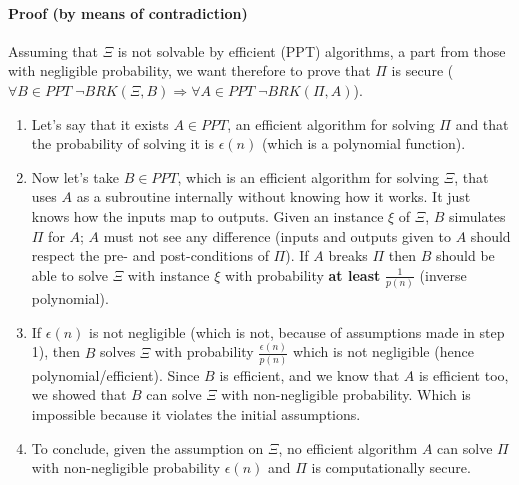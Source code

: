 \documentclass[../main]{subfiles}
\begin{document}
\paragraph{Proof (by means of contradiction)}
Assuming that $\Xi$ is not solvable by efficient (PPT) algorithms, a part from those with negligible probability, we want therefore to prove that $\Pi$ is secure ($\forall{} B \in{} PPT \; \neg BRK(\Xi, B) \Rightarrow{} \forall{} A \in{} PPT \; \neg BRK(\Pi, A)$).\\
\begin{enumerate}
    \item Let's say that it exists $A \in PPT$, an efficient algorithm for solving $\Pi$ and that the probability of solving it is $\epsilon(n)$ (which is a polynomial function).
    \item Now let's take $B \in{} PPT$, which is an efficient algorithm for solving $\Xi$, that uses $A$ as a subroutine internally without knowing how it works.
    It just knows how the inputs map to outputs. Given an instance $\xi$ of $\Xi$, $B$ simulates $\Pi$ for $A$; $A$ must not see any difference (inputs and outputs given to $A$ should respect the pre- and post-conditions of $\Pi$).
    If $A$ breaks $\Pi$ then $B$ should be able to solve $\Xi$ with instance $\xi$ with probability \textbf{at least} $\frac{1}{p(n)}$ (inverse polynomial).
    \item If $\epsilon(n)$ is not negligible (which is not, because of assumptions made in step 1), then $B$ solves $\Xi$ with probability $\frac{\epsilon(n)}{p(n)}$ which is not negligible (hence polynomial/efficient).
    Since $B$ is efficient, and we know that $A$ is efficient too, we showed that $B$ can solve $\Xi$ with non-negligible probability. Which is impossible because it violates the initial assumptions.
    \item To conclude, given the assumption on $\Xi$, no efficient algorithm $A$ can solve $\Pi$ with non-negligible probability $\epsilon(n)$ and $\Pi$ is computationally secure. 
\end{enumerate}
\end{document}
